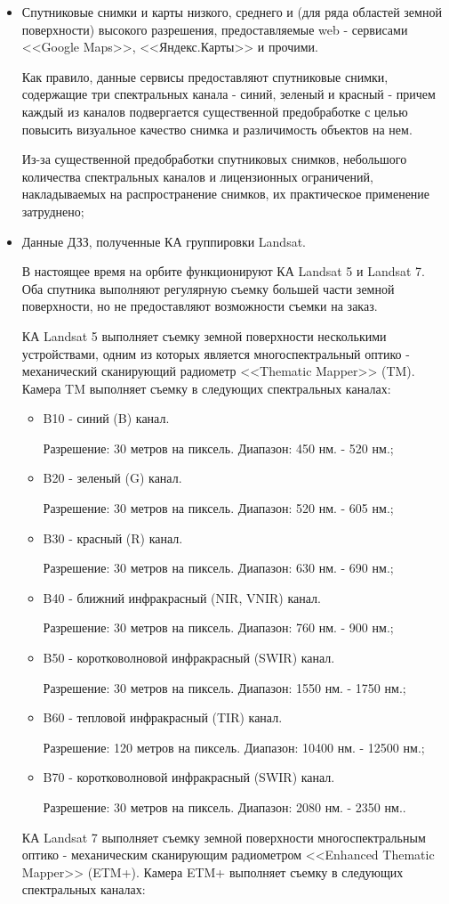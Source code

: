 \begin{itemize}

	\item Спутниковые снимки и карты низкого, среднего и (для ряда областей земной поверхности) высокого разрешения, предоставляемые web - сервисами <<Google Maps>>, <<Яндекс.Карты>> и прочими.

	Как правило, данные сервисы предоставляют спутниковые снимки, содержащие три спектральных канала - синий, зеленый и красный - причем каждый из каналов подвергается существенной предобработке с целью повысить визуальное качество снимка и различимость объектов на нем.

	Из-за существенной предобработки спутниковых снимков, небольшого количества спектральных каналов и лицензионных ограничений, накладываемых на распространение снимков, их практическое применение затруднено;

	\item Данные ДЗЗ, полученные КА группировки Landsat. \cite{gis-lab-l5} \cite{gis-lab-l7}

	В настоящее время на орбите функционируют КА Landsat 5 и Landsat 7. Оба спутника выполняют регулярную съемку большей части земной поверхности, но не предоставляют возможности съемки на заказ.

	КА Landsat 5 выполняет съемку земной поверхности несколькими устройствами, одним из которых является многоспектральный оптико - механический сканирующий радиометр <<Thematic Mapper>> (TM). Камера TM выполняет съемку в следующих спектральных каналах:

	\newcommand{\channel}[6]
	{
		\item B{#1}0 - #2 канал.

		Разрешение: #3 метров на пиксель.
		Диапазон: #4 нм. - #5 нм.#6
	}

	\begin{itemize}

		\channel{1}{синий (B)}{30}{450}{520}{;}
		\channel{2}{зеленый (G)}{30}{520}{605}{;}
		\channel{3}{красный (R)}{30}{630}{690}{;}
		\channel{4}{ближний инфракрасный (NIR, VNIR)}{30}{760}{900}{;}
		\channel{5}{коротковолновой инфракрасный (SWIR)}{30}{1550}{1750}{;}
		\channel{6}{тепловой инфракрасный (TIR)}{120}{10400}{12500}{;}
		\channel{7}{коротковолновой инфракрасный (SWIR)}{30}{2080}{2350}{.}

	\end{itemize}
			
	КА Landsat 7 выполняет съемку земной поверхности многоспектральным оптико - механическим сканирующим радиометром <<Enhanced Thematic Mapper>> (ETM+). Камера ETM+ выполняет съемку в следующих спектральных каналах:


\end{itemize}
